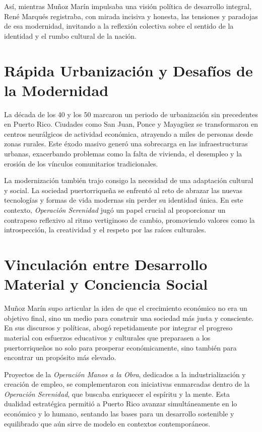 \documentclass[
]{book}
\begin{document}
Así, mientras Muñoz Marín impulsaba una visión política de desarrollo integral, René Marqués registraba, con mirada incisiva y honesta, las tensiones y paradojas de esa modernidad, invitando a la reflexión colectiva sobre el sentido de la identidad y el rumbo cultural de la nación.

\section{Rápida Urbanización y Desafíos de la Modernidad}\label{ruxe1pida-urbanizaciuxf3n-y-desafuxedos-de-la-modernidad}

La década de los 40 y los 50 marcaron un periodo de urbanización sin precedentes en Puerto Rico. Ciudades como San Juan, Ponce y Mayagüez se transformaron en centros neurálgicos de actividad económica, atrayendo a miles de personas desde zonas rurales. Este éxodo masivo generó una sobrecarga en las infraestructuras urbanas, exacerbando problemas como la falta de vivienda, el desempleo y la erosión de los vínculos comunitarios tradicionales.

La modernización también trajo consigo la necesidad de una adaptación cultural y social. La sociedad puertorriqueña se enfrentó al reto de abrazar las nuevas tecnologías y formas de vida modernas sin perder su identidad única. En este contexto, \emph{Operación Serenidad} jugó un papel crucial al proporcionar un contrapeso reflexivo al ritmo vertiginoso de cambio, promoviendo valores como la introspección, la creatividad y el respeto por las raíces culturales.

\section{Vinculación entre Desarrollo Material y Conciencia Social}\label{vinculaciuxf3n-entre-desarrollo-material-y-conciencia-social}

Muñoz Marín supo articular la idea de que el crecimiento económico no era un objetivo final, sino un medio para construir una sociedad más justa y consciente. En sus discursos y políticas, abogó repetidamente por integrar el progreso material con esfuerzos educativos y culturales que preparasen a los puertorriqueños no solo para prosperar económicamente, sino también para encontrar un propósito más elevado.

Proyectos de la \emph{Operación Manos a la Obra}, dedicados a la industrialización y creación de empleo, se complementaron con iniciativas enmarcadas dentro de la \emph{Operación Serenidad}, que buscaba enriquecer el espíritu y la mente. Esta dualidad estratégica permitió a Puerto Rico avanzar simultáneamente en lo económico y lo humano, sentando las bases para un desarrollo sostenible y equilibrado que aún sirve de modelo en contextos contemporáneos.
\end{document}
